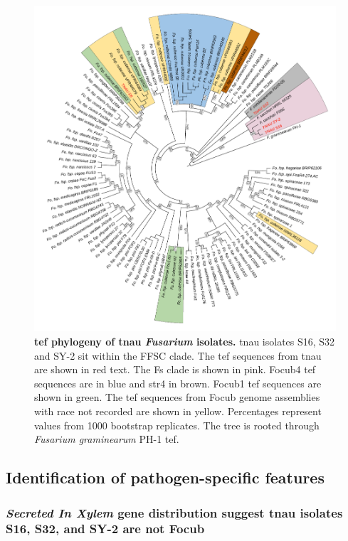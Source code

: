 \begin{figure}[htp!]
    \centering
    \includegraphics[width=14cm]{Figures/TEF1-aPhylo3.pdf}
    \caption[\Acl{tef} phylogeny of \acl{tnau} \textit{Fusarium} isolates.]{\textbf{\Acl{tef} phylogeny of \acl{tnau} \textit{Fusarium} isolates.} \Ac{tnau} isolates S16, S32 and SY-2 sit within the \acf{FFSC} clade. The \ac{tef} sequences from \ac{tnau} are shown in red text. The \acf{Fs} clade is shown in pink. \Acf{Focub4} \ac{tef} sequences are in blue and \acf{str4} in brown. \Acf{Focub1} \ac{tef} sequences are shown in green. The \ac{tef} sequences from \acf{Focub} genome assemblies with race not recorded are shown in yellow. Percentages represent values from 1000 bootstrap replicates. The tree is rooted through \textit{Fusarium graminearum} PH-1 \ac{tef}.}
    \label{fig:TEF1aPhylo}
\end{figure}
\bigskip

\subsection{Identification of pathogen-specific features}

\subsubsection{\textit{Secreted In Xylem} gene distribution suggest \ac{tnau} isolates S16, S32, and SY-2 are not \ac{Focub} }

